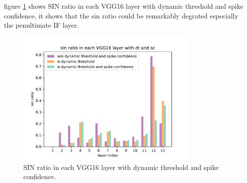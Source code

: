 \documentclass{article}
\begin{document}
figure \ref{sin:after} shows SIN ratio in each VGG16 layer with dynamic threshold and spike confidence, it shows that the sin ratio could be remarkably degrated especially the penultimate IF layer.
\begin{figure}[htbp]
  \centering
  \includegraphics[width=0.8\textwidth]{./fig/sin_ratio_after.pdf}
  \caption{SIN ratio in each VGG16 layer with dynamic threshold and spike confidence.}
  \label{sin:after}
\end{figure}
\end{document}
